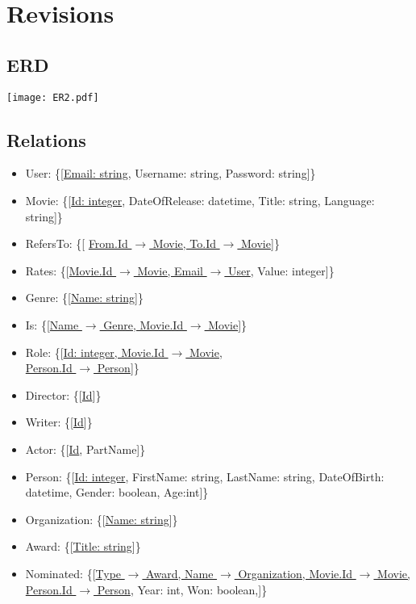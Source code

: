 \section{Revisions}

\subsection{ERD}
\texttt{[image: ER2.pdf]}

\subsection{Relations}
\begin{itemize}
\item User: \{[\underline{Email: string}, Username: string, Password: string]\}

\item Movie: \{[\underline{Id: integer}, DateOfRelease: datetime, Title: string, Language: string]\}

\item RefersTo: \{[ \underline{From.Id $\rightarrow$ Movie, To.Id $\rightarrow$ Movie}]\}

\item Rates: \{[\underline{Movie.Id $\rightarrow$ Movie, Email $ \rightarrow $ User}, Value: integer]\}

\item Genre: \{[\underline{Name: string}]\}

\item Is: \{[\underline{Name $\rightarrow$ Genre, Movie.Id $\rightarrow$ Movie}]\}

\item Role: \{[\underline{Id: integer, Movie.Id $\rightarrow$ Movie},\\ \underline{Person.Id $ \rightarrow $ Person}]\}

\item Director: \{[\underline{Id}]\}

\item Writer: \{[\underline{Id}]\}

\item Actor: \{[\underline{Id}, PartName]\}

\item Person: \{[\underline{Id: integer}, FirstName: string, LastName: string, DateOfBirth: datetime, Gender: boolean, Age:int]\}

\item Organization: \{[\underline{Name: string}]\}

\item Award: \{[\underline{Title: string}]\}

\item Nominated: \{[\underline{Type $ \rightarrow $ Award, Name $ \rightarrow $ Organization, Movie.Id $\rightarrow$ Movie,}\\
\underline{Person.Id $ \rightarrow $ Person}, Year: int, Won: boolean,]\}
\end{itemize}

